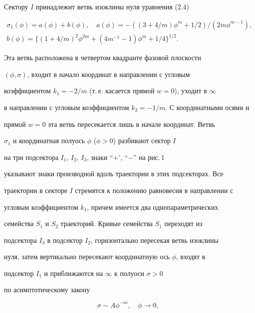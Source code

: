 \medskip 


 


\noindent{}Сектору $I$ принадлежит ветвь изоклины нуля уравнения (2.4) 


\begin{gather*} 


\sigma_1(\phi)=a(\phi)+b(\phi),\quad a(\phi)=-((3+4/m) 


\phi^m+1/2)/(2m\phi^{m-1}),\\ 


b(\phi)=\{(1+4/m)^2\phi^{2m}+(4m^{-1}-1)\phi^m+1/4\}^{1/2}. 


\end{gather*} 


Эта ветвь расположена в четвертом квадранте фазовой плоскости 


$(\phi,\sigma)$, входит в начало координат в направлении с угловым 


коэффициентом $k_1=-2/m$ (т.\,е. касается прямой $w=0$), уходит в $\infty$ 


в направлении с угловым коэффициентом $k_2=-1/m$. С координатными осями и 


прямой $w=0$ эта ветвь пересекается лишь в начале координат. Ветвь 


$\sigma_1$ и координатная полуось $\phi$ ($\phi>0$) разбивают сектор $I$ 


на три подсектора $I_1$, $I_2$, $I_3$, знаки ``$+$', ``$-$'' на рис.\,1 


указывают знаки производной вдоль траектории в этих подсекторах. Все 


траектории в секторе $I$ стремятся к положению равновесия в направлении с 


угловым коэффициентом $k_1$, причем имеется два однопараметрических 


семейства $S_1$ и $S_2$ траекторий. Кривые семейства $S_1$ переходят из 


подсектора $I_3$ в подсектор $I_2$, горизонтально пересекая ветвь изоклины 


нуля, затем вертикально пересекают координатную ось $\phi$, входят в 


подсектор $I_1$ и приближаются на $\infty$ к полуоси $\sigma>0$ 


по асимптотическому закону 


\begin{equation} 


\sigma\sim A\phi^{-m},\quad \phi\to0, 


\end{equation} 


